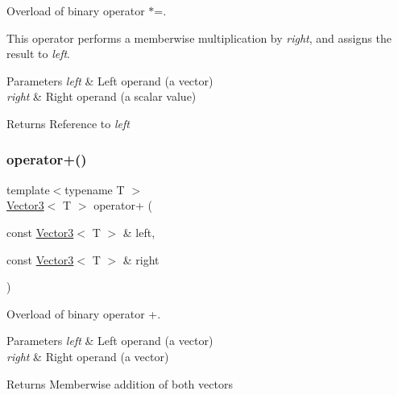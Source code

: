Overload of binary operator $\ast$=. 

This operator performs a memberwise multiplication by {\itshape right}, and assigns the result to {\itshape left}.


\begin{DoxyParams}{Parameters}
{\em left} & Left operand (a vector) \\
\hline
{\em right} & Right operand (a scalar value)\\
\hline
\end{DoxyParams}
\begin{DoxyReturn}{Returns}
Reference to {\itshape left} \begin{DoxyVerb}\end{DoxyVerb}
 
\end{DoxyReturn}
\mbox{\label{classsf_1_1_vector3_a6500a0cb00e07801e9e9d7e96852ddd3}} 
\subsubsection{\texorpdfstring{operator+()}{operator+()}}
{\footnotesize\ttfamily template$<$typename T $>$ \\
\mbox{\hyperlink{classsf_1_1_vector3}{Vector3}}$<$ T $>$ operator+ (\begin{DoxyParamCaption}\item[{const \mbox{\hyperlink{classsf_1_1_vector3}{Vector3}}$<$ T $>$ \&}]{left,  }\item[{const \mbox{\hyperlink{classsf_1_1_vector3}{Vector3}}$<$ T $>$ \&}]{right }\end{DoxyParamCaption})\hspace{0.3cm}{\ttfamily [related]}}



Overload of binary operator +. 


\begin{DoxyParams}{Parameters}
{\em left} & Left operand (a vector) \\
\hline
{\em right} & Right operand (a vector)\\
\hline
\end{DoxyParams}
\begin{DoxyReturn}{Returns}
Memberwise addition of both vectors \begin{DoxyVerb}\end{DoxyVerb}
 
\end{DoxyReturn}
\mbox{\label{classsf_1_1_vector3_abc28859af163c63318ea2723b81c5ad9}} 
